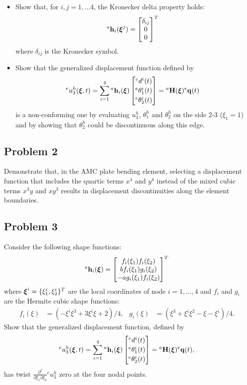\documentclass[12pt]{article}
\begin{document}
\begin{itemize}
    \item[a)] Show that, for $i,j=1,\dots 4$, the Kronecker delta property holds: $${}^a\mathbf  h_i(\boldsymbol\xi^j)=\begin{bmatrix}
                  \delta_{ij} \\ 0 \\ 0
              \end{bmatrix}^T$$
          where $\delta_{ij}$ is the Kronecker symbol.
    \item[b)] Show that the generalized displacement function defined by
          $$ {}^eu_3^h(\boldsymbol\xi,t)  =\sum_{i=1}^4  {}^a\mathbf h_i(\boldsymbol\xi) \begin{bmatrix}
                  {}^ed^i(t) \\[2pt] {}^e{\theta}^i_1(t) \\[2pt] {}^e{\theta}^i_2(t)
              \end{bmatrix}= {}^a\mathbf{H}(\boldsymbol\xi){}^e\mathbf{q}(t)$$
          is a non-conforming one by evaluating $u_3^h$, $\theta_1^h$ and $\theta_2^h$ on the side 2-3 ($\xi_1=1$) and by showing that $\theta_2^h$ could be discontinuous along this edge.
\end{itemize}

\subsection*{Problem 2}
Demonstrate that, in the AMC plate bending element, selecting a displacement function that includes the quartic terms $x^4$ and $y^4$ instead of the mixed cubic terms $x^3 y$ and $x y^3$ results in displacement discontinuities along the element boundaries.

\subsection*{Problem 3}
Consider the following shape functions:
$$ {}^a\mathbf  h_i(\boldsymbol\xi) =\begin{bmatrix}
        f_i(\xi_1)f_i(\xi_2)     \\
        bf_i(\xi_1)g_i(\xi_2 )   \\
        -a g_i(\xi_1)f_i(\xi_2 ) \\
    \end{bmatrix}^T$$
where $\boldsymbol\xi^i=\{\xi_1^i,\xi_2^i\}^T$ are the local coordinates of node $i=1,\dots,4$ and $f_i$ and $g_i$ are the Hermite cubic shape functions:
\begin{align*}
    f_i(\xi) & =(-\xi^i\xi^3+3\xi^i\xi+2)/4, & g_i(\xi) & =(\xi^3+\xi^i\xi^2-\xi-\xi^i)/4.
\end{align*}
Show that the generalized displacement function, defined by
$$ {}^eu_3^h(\boldsymbol\xi,t)  =\sum_{i=1}^4  {}^a\mathbf h_i(\boldsymbol\xi) \begin{bmatrix}
        {}^ed^i(t) \\[2pt] {}^e{\theta}^i_1(t) \\[2pt] {}^e{\theta}^i_2(t)
    \end{bmatrix}= {}^a\mathbf{H}(\boldsymbol\xi){}^e\mathbf{q}(t),$$
has twist $\frac{\partial^2}{\partial\xi_1\partial\xi_2}{}^eu_3^h$ zero at the four nodal points.
\end{document}
